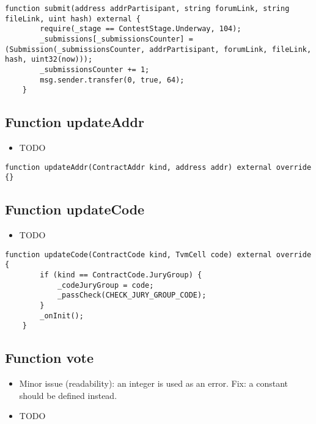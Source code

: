\begin{lstlisting}[firstnumber=121]
    function submit(address addrPartisipant, string forumLink, string fileLink, uint hash) external {
        require(_stage == ContestStage.Underway, 104);
        _submissions[_submissionsCounter] = (Submission(_submissionsCounter, addrPartisipant, forumLink, fileLink, hash, uint32(now)));
        _submissionsCounter += 1;
        msg.sender.transfer(0, true, 64);
    }
\end{lstlisting}

\subsection{Function updateAddr}

\begin{itemize}
\item TODO
\end{itemize}

\begin{lstlisting}[firstnumber=81]
    function updateAddr(ContractAddr kind, address addr) external override {}
\end{lstlisting}

\subsection{Function updateCode}

\begin{itemize}
\item TODO
\end{itemize}

\begin{lstlisting}[firstnumber=73]
    function updateCode(ContractCode kind, TvmCell code) external override {
        if (kind == ContractCode.JuryGroup) {
            _codeJuryGroup = code;
            _passCheck(CHECK_JURY_GROUP_CODE);
        }
        _onInit();
    }
\end{lstlisting}

\subsection{Function vote}

\begin{itemize}
\item Minor issue (readability): an integer is used as an error. Fix:
  a constant should be defined instead.
\item TODO
\end{itemize}

